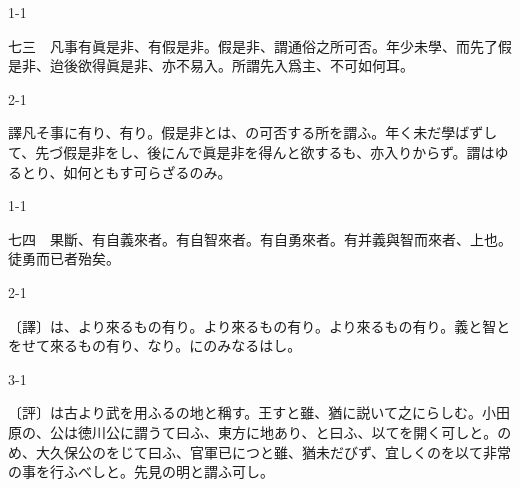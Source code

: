 \documentclass[tate,paper=b6j,jafontsize=9pt]{jlreq}
\begin{document}
\begin{azconvIndented}{1\zw}{-1\zw}

七三　凡事有眞是非、有假是非。假是非、謂通俗之所可否。年少未學、而先了假是非、迨後欲得眞是非、亦不易入。所謂先入爲主、不可如何耳。

\end{azconvIndented}
\begin{azconvIndented}{2\zw}{-1\zw}

譯凡そ事に有り、有り。假是非とは、の可否する所を謂ふ。年く未だ學ばずして、先づ假是非をし、後にんで眞是非を得んと欲するも、亦入りからず。謂はゆるとり、如何ともす可らざるのみ。

\end{azconvIndented}

\begin{azconvIndented}{1\zw}{-1\zw}

七四　果斷、有自義來者。有自智來者。有自勇來者。有并義與\azconvKunten{\azconvIR}智而來者、上也。徒勇而已者殆矣。

\end{azconvIndented}
\begin{azconvIndented}{2\zw}{-1\zw}

〔譯〕は、より來るもの有り。より來るもの有り。より來るもの有り。義と智とをせて來るもの有り、なり。にのみなるはし。

\end{azconvIndented}
\begin{azconvIndented}{3\zw}{-1\zw}

〔評〕は古より武を用ふるの地と稱す。王すと雖、猶に説いて之にらしむ。小田原の、公は徳川公に謂うて曰ふ、東方に地あり、と曰ふ、以てを開く可しと。のめ、大久保公のをじて曰ふ、官軍已につと雖、猶未だびず、宜しくのを以て非常の事を行ふべしと。先見の明と謂ふ可し。

\end{azconvIndented}
\end{document}
